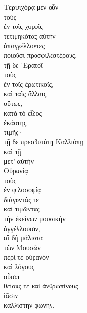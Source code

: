 {\large
\begin{greek}
\noindent 
Τερψιχόρᾳ μὲν οὖν \\
\tabto{2em} τοὺς \\
\tabto{4em} ἐν τοῖς χοροῖς \\
\tabto{2em} τετιμηκότας αὐτὴν \\
ἀπαγγέλλοντες \\
\tabto{2em} ποιοῦσι προσφιλεστέρους, \\
τῇ δὲ ᾿Ερατοῖ \\
\tabto{2em} τοὺς \\
\tabto{4em} ἐν τοῖς ἐρωτικοῖς, \\
καὶ ταῖς ἄλλαις \\
\tabto{2em} οὕτως, \\
\tabto{4em} κατὰ τὸ εἶδος \\
\tabto{6em} ἑκάστης \\
\tabto{8em} τιμῆς· \\
τῇ δὲ πρεσβυτάτῃ Καλλιόπῃ \\
καὶ τῇ \\
\tabto{2em} μετ' αὐτὴν \\
Οὐρανίᾳ \\
\tabto{2em} τοὺς \\
\tabto{4em} ἐν φιλοσοφίᾳ \\
\tabto{2em} διάγοντάς τε \\
\tabto{2em} καὶ τιμῶντας \\
\tabto{4em} τὴν ἐκείνων μουσικὴν \\
ἀγγέλλουσιν, \\
\tabto{2em} αἳ δὴ μάλιστα \\
\tabto{4em} τῶν Μουσῶν \\
\tabto{4em} περί τε οὐρανὸν \\
\tabto{6em} καὶ λόγους \\
\tabto{2em} οὖσαι \\
\tabto{6em} θείους τε καὶ ἀνθρωπίνους \\
\tabto{2em} ἱᾶσιν \\
\tabto{4em} καλλίστην φωνήν.\\

\end{greek}
}

